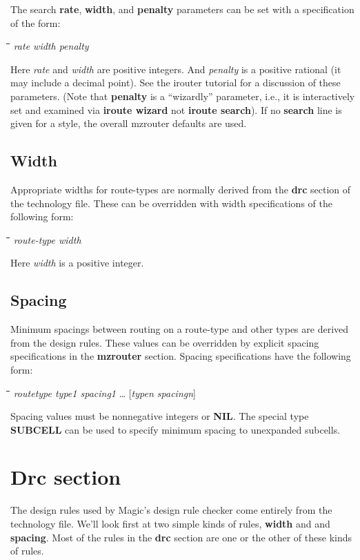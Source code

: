 \documentclass[letterpaper,twoside,12pt]{article}
\def\hinch{\hspace*{0.5in}}
\def\starti{\begin{center}\begin{tabbing}\hinch\=\hinch\=\hinch\=\hinch\=\kill}
\def\endi{\end{tabbing}\end{center}}
\def\ii{\>\>\>}
\begin{document}
The search {\bfseries rate}, {\bfseries width}, and {\bfseries penalty} parameters can 
be set with a specification of the form:

\starti
   \ii {\bfseries search} {\itshape  rate width penalty}
\endi

Here {\itshape rate} and {\itshape width} are positive integers.  And {\itshape penalty}
is a positive rational (it may include a decimal point).  See the irouter
tutorial for a discussion of these parameters.  (Note that {\bfseries penalty}
is a ``wizardly'' parameter, i.e., it is interactively
set and examined via {\bfseries iroute wizard} not {\bfseries iroute search}).
If no {\bfseries search} line
is given for a style, the overall mzrouter defaults are used.

\subsection{Width}

Appropriate widths for route-types are normally derived from the {\bfseries drc}
section
of the technology file.  These can be overridden with width specifications
of the following form:

\starti
   \ii {\bfseries width} {\itshape route-type width}
\endi

Here {\itshape width} is a positive integer.

\subsection{Spacing}

Minimum spacings between routing on a route-type and other types are
derived from the design rules.  These values can be overridden by explicit
spacing specifications in the {\bfseries mzrouter} section.  Spacing 
specifications have the following form:

\starti
   \ii {\bfseries spacing} {\itshape  routetype type1 spacing1 } \dots
	 [{\itshape typen spacingn}]
\endi

Spacing values must be nonnegative integers or {\bfseries NIL}.  The special type
{\bfseries SUBCELL} can be used to specify minimum spacing to unexpanded subcells.

\section{Drc section}

The design rules used by Magic's design rule checker
come entirely from the technology file.
We'll look first at two simple kinds of rules,
{\bfseries width} and and {\bfseries spacing}.
Most of the rules in the {\bfseries drc}
section are one or the other of these kinds of rules.
\end{document}
